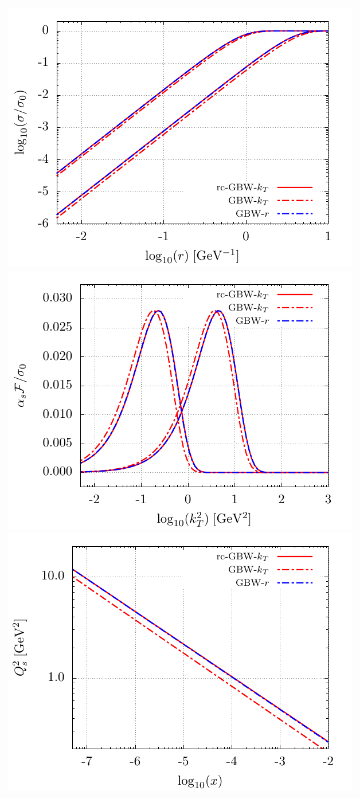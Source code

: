 \documentclass[11pt]{article}
\numberwithin{equation}{section}
\numberwithin{table}{section}
\numberwithin{figure}{section}
\begin{document}
\begin{figure}[p]

  \begin{multicols}{2}
  \begin{subfigure}{0.5\textwidth}
    \includegraphics[width=\textwidth]{./plots/GBW-dipole.pdf}
    \includegraphics[width=\textwidth]{./plots/GBW-gluon.pdf}
    \includegraphics[width=\textwidth]{./plots/GBW-saturation.pdf}

\end{subfigure}
\end{multicols}
\end{figure}
\end{document}
